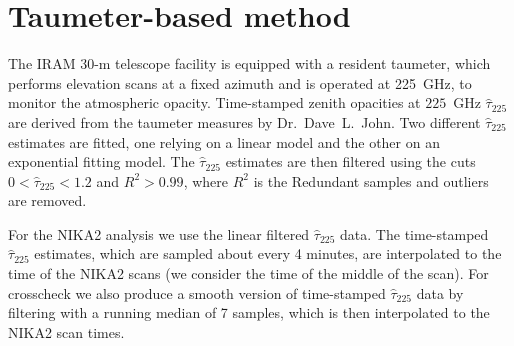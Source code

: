 \section{Taumeter-based method}%
\label{se:taumeter-method}

The IRAM 30-m telescope facility is equipped with a resident taumeter, which performs
elevation scans at a fixed azimuth and is operated at 225~GHz, to
monitor the atmospheric opacity.
Time-stamped zenith opacities at $225$~GHz $\hat{\tau}_{225}$ are derived from the
taumeter measures by Dr.~Dave~L.~John. Two different $\hat{\tau}_{225}$
estimates are fitted, one relying on a linear model and the other on
an exponential fitting model. The $\hat{\tau}_{225}$ estimates are then
filtered using the cuts $0< \hat{\tau}_{225} <1.2$ and $R^2 > 0.99$, where
$R^2$ is the 
Redundant samples and outliers are removed.

For the NIKA2 analysis we use the linear filtered  $\hat{\tau}_{225}$ data.
The time-stamped $\hat{\tau}_{225}$ estimates, which are sampled about
every 4 minutes, are interpolated to the time of the NIKA2 scans (we
consider the time of the middle of the scan). For crosscheck we also
produce a smooth version of time-stamped $\hat{\tau}_{225}$ data by
filtering with a running median of 7 samples, which is then
interpolated to the NIKA2 scan times.



